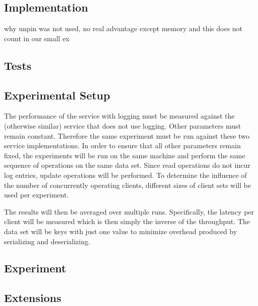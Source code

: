 \documentclass[a4paper,11pt]{article}
\begin{document}
\subsection{Implementation}
\label{sec:pt1}
why unpin was not used, no real advantage except memory and this does not count in our small ex

\subsection{Tests}
\label{sec:pt2}

\subsection{Experimental Setup}
\label{sec:pt3}
The performance of the service with logging must be measured against the (otherwise similar) service that does not use logging. Other parameters must remain constant. Therefore the same experiment must be run against these two service implementations. In order to ensure that all other parameters remain fixed, the experiments will be run on the same machine and perform the same sequence of operations on the same data set. Since read operations do not incur log entries, update operations will be performed. To determine the influence of the number of concurrently operating clients, different sizes of client sets will be used per experiment.

The results will then be averaged over multiple runs. Specifically, the latency per client will be measured which is then simply the inverse of the throughput. The data set will be keys with just one value to minimize overhead produced by serializing and deserializing.

\subsection{Experiment}
\label{sec:pt4}

\subsection{Extensions}
\label{sec:pt5}
\end{document}
